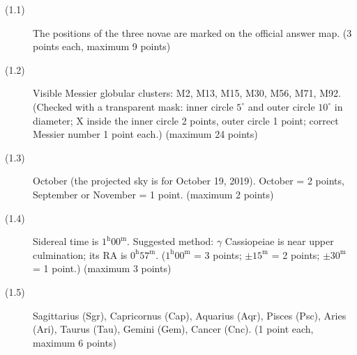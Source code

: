 \begin{description}
\item[(1.1)] The positions of the three novae are marked on the official
  answer map. \hfill(3 points each, maximum 9 points)
\item[(1.2)] Visible Messier globular clusters: M2, M13, M15, M30, M56,
  M71, M92. (Checked with a transparent mask: inner circle $5^\circ$ and
  outer circle $10^\circ$ in diameter; X inside the inner circle 2 points,
  outer circle 1 point; correct Messier number 1 point each.)
  \hfill(maximum 24 points)
\item[(1.3)] October (the projected sky is for October 19, 2019).
  October = 2 points, September or November = 1 point.
  \hfill(maximum 2 points)
\item[(1.4)] Sidereal time is $1^{\mathrm{h}}00^{\mathrm{m}}$. Suggested
  method: $\gamma$ Cassiopeiae is near upper culmination; its RA is
  $0^{\mathrm{h}}57^{\mathrm{m}}$.
  ($1^{\mathrm{h}}00^{\mathrm{m}}$ = 3 points; $\pm 15^{\mathrm{m}}$ = 2
  points; $\pm 30^{\mathrm{m}}$ = 1 point.) \hfill(maximum 3 points)
\item[(1.5)] Sagittarius (Sgr), Capricornus (Cap), Aquarius (Aqr), Pisces
  (Psc), Aries (Ari), Taurus (Tau), Gemini (Gem), Cancer (Cnc).
  \hfill(1 point each, maximum 6 points)
\end{description}
